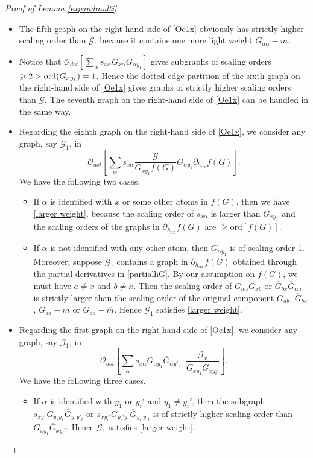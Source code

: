 \documentclass{article}
\newcommand{\1}{\mathds{1}}
\numberwithin{equation}{section}
\newcommand{\ord}{{\rm{ord}}}
\newcommand{\al}{\alpha}
\renewcommand{\cal}{\mathcal}
\renewcommand{\geq}{\geqslant}
\renewcommand{\ge}{\geq}
\theoremstyle{plain} %
\theoremstyle{remark}
\begin{document}
\begin{proof} [Proof of Lemma \ref{expandmulti}]
\begin{itemize}
\item[(2)] The fifth graph on the right-hand side of \eqref{Oe1x} obviously has strictly higher scaling order than $\cal G$, because it contains one more light weight $G_{\al\al}-m$. 
 
\item[(3)] %
Notice that $ \cal O_{dot}\left[ \sum_\al s_{x\al }G_{x \al}G_{\al y_1}  \right]$ gives subgraphs of scaling orders $\ge 2 > \ord(G_{xy_1})=1$. Hence the dotted edge partition of the sixth graph on the right-hand side of \eqref{Oe1x} gives graphs of strictly higher scaling orders than $\cal G$. The seventh graph on the right-hand side of \eqref{Oe1x} can be handled in the same way.

\item[(4)] Regarding the eighth graph on the right-hand side of \eqref{Oe1x}, we consider any graph, say $\cal G_1$, in $$\cal O_{dot}\left[ \sum_\al s_{x\al } \frac{\cal G}{G_{x y_1}f (G)}G_{\al y_1}\partial_{ h_{ \al x}}f (G)\right].$$
We have the following two cases.
\begin{itemize}
\item If $\al$ is identified with $x$ or some other atoms in $f (G)$, then we have \eqref{larger weight}, because the scaling order of $s_{x\al}$ is larger than $G_{xy_1}$ and the scaling orders of the graphs in $ \partial_{h_{\al x}}f (G) $ are $ \ge \text{ord}[f (G) ] $. %

\item If $\al$ is not identified with any other atom, then $G_{\al y_1}$ is of scaling order 1. Moreover, suppose $\cal G_1$ contains a graph in $\partial_{ h_{\al x}} f (G)$ obtained through the partial derivatives in \eqref{partialhG}. By our assumption on $f (G)$, we must have $a \ne x$ and $b\ne x$. Then the scaling order of $G_{a\al}G_{xb}$ or $\overline G_{bx}\overline G_{\al a}$ is strictly larger than the scaling order of the original component $G_{ab}$, $\overline G_{ba}$, $G_{aa}-m$ or $\overline G_{aa}-\overline m$. Hence %
$\cal G_1$ satisfies \eqref{larger weight}.
\end{itemize}
  

\item[(5)] Regarding the first graph on the right-hand side of \eqref{Oe1x}. we consider any graph, say $\cal G_1$, in $$\cal O_{dot}\left[  \sum_\al s_{x\al }G_{\al y_1} \overline G_{\al y'_i}\cdot \frac{\cal G_x}{G_{x y_1} \overline G_{xy_i'}} \right].$$
We have the following three cases.
\begin{itemize}
\item If $\al$ is identified with $y_1$ or $y_i'$ and $y_1\ne y_i'$, then the subgraph $s_{xy_1}G_{y_1 y_1} \overline G_{y_1 y'_i}$ or $s_{xy_i'}G_{y_i' y_1} \overline G_{y_i' y'_i}$ is of strictly higher scaling order than $G_{x y_1} \overline G_{xy_i'}$. Hence $\cal G_1$ satisfies \eqref{larger weight}. %


\end{itemize}
\end{itemize}
\end{proof}
\end{document}
